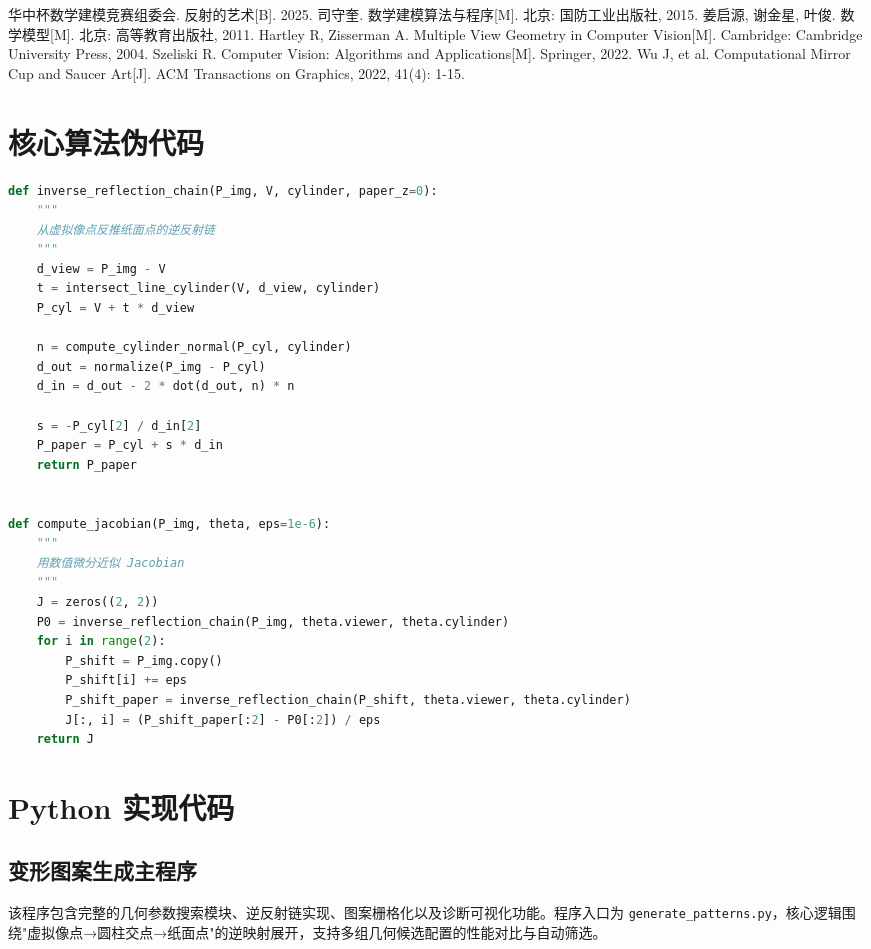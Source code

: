 \documentclass[a4paper,12pt]{ctexart}
\begin{document}
\begin{thebibliography}{99}
 华中杯数学建模竞赛组委会. 反射的艺术[B]. 2025.
 司守奎. 数学建模算法与程序[M]. 北京: 国防工业出版社, 2015.
 姜启源, 谢金星, 叶俊. 数学模型[M]. 北京: 高等教育出版社, 2011.
 Hartley R, Zisserman A. Multiple View Geometry in Computer Vision[M]. Cambridge: Cambridge University Press, 2004.
 Szeliski R. Computer Vision: Algorithms and Applications[M]. Springer, 2022.
 Wu J, et al. Computational Mirror Cup and Saucer Art[J]. ACM Transactions on Graphics, 2022, 41(4): 1-15.
\end{thebibliography}

\newpage
\begin{appendices}

\section{核心算法伪代码}

\begin{lstlisting}[language=Python]
def inverse_reflection_chain(P_img, V, cylinder, paper_z=0):
    """
    从虚拟像点反推纸面点的逆反射链
    """
    d_view = P_img - V
    t = intersect_line_cylinder(V, d_view, cylinder)
    P_cyl = V + t * d_view

    n = compute_cylinder_normal(P_cyl, cylinder)
    d_out = normalize(P_img - P_cyl)
    d_in = d_out - 2 * dot(d_out, n) * n

    s = -P_cyl[2] / d_in[2]
    P_paper = P_cyl + s * d_in
    return P_paper


def compute_jacobian(P_img, theta, eps=1e-6):
    """
    用数值微分近似 Jacobian
    """
    J = zeros((2, 2))
    P0 = inverse_reflection_chain(P_img, theta.viewer, theta.cylinder)
    for i in range(2):
        P_shift = P_img.copy()
        P_shift[i] += eps
        P_shift_paper = inverse_reflection_chain(P_shift, theta.viewer, theta.cylinder)
        J[:, i] = (P_shift_paper[:2] - P0[:2]) / eps
    return J
\end{lstlisting}

\section{Python 实现代码}

\subsection{变形图案生成主程序}
\par 该程序包含完整的几何参数搜索模块、逆反射链实现、图案栅格化以及诊断可视化功能。程序入口为 \texttt{generate\_patterns.py}，核心逻辑围绕"虚拟像点→圆柱交点→纸面点"的逆映射展开，支持多组几何候选配置的性能对比与自动筛选。


\end{appendices}
\end{document}

